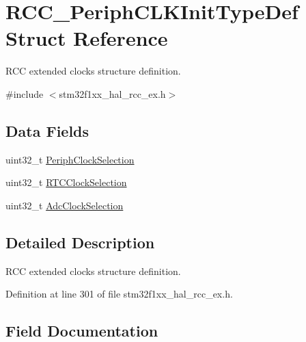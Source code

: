 \hypertarget{struct_r_c_c___periph_c_l_k_init_type_def}{}\section{R\+C\+C\+\_\+\+Periph\+C\+L\+K\+Init\+Type\+Def Struct Reference}
\label{struct_r_c_c___periph_c_l_k_init_type_def}


R\+CC extended clocks structure definition.  




{\ttfamily \#include $<$stm32f1xx\+\_\+hal\+\_\+rcc\+\_\+ex.\+h$>$}

\subsection*{Data Fields}
\begin{DoxyCompactItemize}
\item 
uint32\+\_\+t \hyperlink{struct_r_c_c___periph_c_l_k_init_type_def_a82dae3f6a5ae6c184bd1b95a88d41fc2}{Periph\+Clock\+Selection}
\item 
uint32\+\_\+t \hyperlink{struct_r_c_c___periph_c_l_k_init_type_def_a831cc6023077b77683871743290aa720}{R\+T\+C\+Clock\+Selection}
\item 
uint32\+\_\+t \hyperlink{struct_r_c_c___periph_c_l_k_init_type_def_a28e358df2e95d000ccf4984cd14250e8}{Adc\+Clock\+Selection}
\end{DoxyCompactItemize}


\subsection{Detailed Description}
R\+CC extended clocks structure definition. 

Definition at line 301 of file stm32f1xx\+\_\+hal\+\_\+rcc\+\_\+ex.\+h.



\subsection{Field Documentation}
\mbox{\label{struct_r_c_c___periph_c_l_k_init_type_def_a28e358df2e95d000ccf4984cd14250e8}} 
